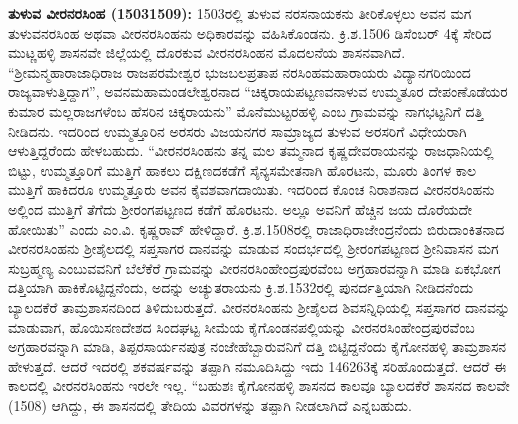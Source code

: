 \textbf{ತುಳುವ ವೀರನರಸಿಂಹ (1503\general{\enginline{-}}1509):} 1503ರಲ್ಲಿ ತುಳುವ ನರಸನಾಯಕನು ತೀರಿಕೊಳ್ಳಲು ಅವನ ಮಗ ತುಳುವನರಸಿಂಹ ಅಥವಾ ವೀರನರಸಿಂಹನು ಅಧಿಕಾರವನ್ನು ವಹಿಸಿಕೊಂಡನು. ಕ್ರಿ.ಶ.1506 ಡಿಸೆಂಬರ್​ 4ಕ್ಕೆ ಸೇರಿದ ಮುಟ್ಣಹಳ್ಳಿ ಶಾಸನವೇ ಜಿಲ್ಲೆಯಲ್ಲಿ ದೊರಕುವ ವೀರನರಸಿಂಹನ ಮೊದಲನೆಯ ಶಾಸನವಾಗಿದೆ. “ಶ‍್ರೀಮನ್ಮಹಾರಾಜಾಧಿರಾಜ ರಾಜಪರಮೇಶ್ವರ ಭುಜಬಲಪ್ರತಾಪ ನರಸಿಂಹಮಹಾರಾಯರು ವಿದ್ಯಾನಗರಿಯಿಂದ ರಾಜ್ಯವಾಳುತ್ತಿದ್ದಾಗ'', ಅವನ\break ಮಹಾಮಂಡಲೇಶ್ವರನಾದ “ಚಿಕ್ಕರಾಯಪಟ್ಟಣವನಾಳುವ ಉಮ್ಮತೂರ ದೇಪಂಣೊಡೆಯರ ಕುಮಾರ ಮಲ್ಲರಾಜಗಳೆಂಬ ಹೆಸರಿನ ಚಿಕ್ಕರಾಯನು'' ಮೊನೆಮುಟ್ಟರಹಳ್ಳಿ ಎಂಬ ಗ್ರಾಮವನ್ನು ನಾಗಭಟ್ಟನಿಗೆ ದತ್ತಿ ನೀಡಿದನು. ಇದರಿಂದ ಉಮ್ಮತ್ತೂರಿನ ಅರಸರು ವಿಜಯನಗರ ಸಾಮ್ರಾಜ್ಯದ ತುಳುವ ಅರಸರಿಗೆ ವಿಧೇಯರಾಗಿ ಆಳುತ್ತಿದ್ದರೆಂದು ಹೇಳಬಹುದು. “ವೀರನರಸಿಂಹನು ತನ್ನ ಮಲ ತಮ್ಮನಾದ ಕೃಷ್ಣದೇವರಾಯನನ್ನು ರಾಜಧಾನಿಯಲ್ಲಿ ಬಿಟ್ಟು, ಉಮ್ಮತ್ತೂರಿಗೆ ಮುತ್ತಿಗೆ ಹಾಕಲು ದಕ್ಷಿಣದಕಡೆಗೆ ಸೈನ್ಯಸಮೇತನಾಗಿ ಹೊರಟನು, ಮೂರು ತಿಂಗಳ ಕಾಲ ಮುತ್ತಿಗೆ ಹಾಕಿದರೂ ಉಮ್ಮತ್ತೂರು ಅವನ ಕೈವಶವಾಗದಾಯಿತು. ಇದರಿಂದ ಕೊಂಚ ನಿರಾಶನಾದ ವೀರನರಸಿಂಹನು ಅಲ್ಲಿಂದ ಮುತ್ತಿಗೆ ತೆಗೆದು ಶ‍್ರೀರಂಗಪಟ್ಟಣದ ಕಡೆಗೆ ಹೊರಟನು. ಅಲ್ಲೂ ಅವನಿಗೆ ಹೆಚ್ಚಿನ ಜಯ ದೊರೆಯದೇ ಹೋಯಿತು” ಎಂದು ಎಂ.ವಿ. ಕೃಷ್ಣರಾವ್​ ಹೇಳಿದ್ದಾರೆ. ಕ್ರಿ.ಶ.1508ರಲ್ಲಿ ರಾಜಾಧಿರಾಜೇಂದ್ರನೆಂದು ಬಿರುದಾಂಕಿತನಾದ ವೀರನರಸಿಂಹನು ಶ‍್ರೀಶೈಲದಲ್ಲಿ ಸಪ್ತಸಾಗರ ದಾನವನ್ನು ಮಾಡುವ ಸಂದರ್ಭದಲ್ಲಿ ಶ‍್ರೀರಂಗಪಟ್ಟಣದ ಶ‍್ರೀನಿವಾಸನ ಮಗ ಸುಬ್ರಹ್ಮಣ್ಯ ಎಂಬುವವನಿಗೆ ಬೆಲೆಕೆರೆ ಗ್ರಾಮವನ್ನು ವೀರನರಸಿಂಹೇಂದ್ರಪುರವೆಂಬ ಅಗ್ರಹಾರವನ್ನಾಗಿ ಮಾಡಿ ಏಕಭೋಗ ದತ್ತಿಯಾಗಿ ಹಾಕಿಕೊಟ್ಟಿದ್ದನೆಂದು, ಅದನ್ನು ಅಚ್ಯುತರಾಯನು ಕ್ರಿ.ಶ.1532ರಲ್ಲಿ ಪುನರ್ದತ್ತಿಯಾಗಿ ನೀಡಿದನೆಂದು ಬ್ಯಾಲದಕೆರೆ ತಾಮ್ರಶಾಸನದಿಂದ ತಿಳಿದುಬರುತ್ತದೆ. ವೀರನರಸಿಂಹನು ಶ‍್ರೀಶೈಲದ ಶಿವಸನ್ನಿಧಿಯಲ್ಲಿ ಸಪ್ತಸಾಗರ ದಾನವನ್ನು ಮಾಡುವಾಗ, ಹೊಯಿಸಣದೇಶದ ಸಿಂದಘಟ್ಟ ಸೀಮೆಯ ಕೈಗೊಂಡನಪಲ್ಲಿಯನ್ನು ವೀರನರಸಿಂಹೇಂದ್ರಪುರವೆಂಬ ಅಗ್ರಹಾರವನ್ನಾಗಿ ಮಾಡಿ, ತಿಪ್ಪರಸಾರ್ಯನಪುತ್ರ ನಂಜೇಹೆಬ್ಬಾರುವನಿಗೆ ದತ್ತಿ ಬಿಟ್ಟಿದ್ದನೆಂದು ಕೈಗೋನಹಳ್ಳಿ ತಾಮ್ರಶಾಸನ ಹೇಳುತ್ತದೆ. ಆದರೆ ಇದರಲ್ಲಿ ಶಕವರ್ಷವನ್ನು ತಪ್ಪಾಗಿ ನಮೂದಿಸಿದ್ದು ಇದು 1462\enginline{-}63ಕ್ಕೆ ಸರಿಹೊಂದುತ್ತದೆ. ಆದರೆ ಈ ಕಾಲದಲ್ಲಿ ವೀರನರಸಿಂಹನು ಇರಲೇ ಇಲ್ಲ. “ಬಹುಶಃ ಕೈಗೋನಹಳ್ಳಿ ಶಾಸನದ ಕಾಲವೂ ಬ್ಯಾಲದಕೆರೆ ಶಾಸನದ ಕಾಲವೇ (1508) ಆಗಿದ್ದು, ಈ ಶಾಸನದಲ್ಲಿ ತೇದಿಯ ವಿವರಗಳನ್ನು ತಪ್ಪಾಗಿ ನೀಡಲಾಗಿದೆ ಎನ್ನಬಹುದು.

